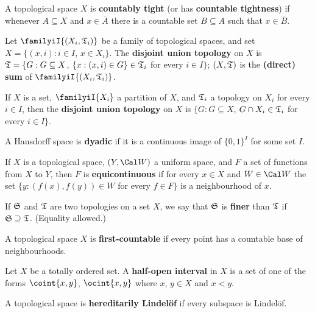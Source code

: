  A topological space $X$ is {\bf countably
tight}
(or has {\bf countable tightness}) if whenever $A\subseteq X$ and
$x\in\overline{A}$ there is a countable set $B\subseteq A$ such that
$x\in\overline{B}$.


 Let $\familyiI{(X_i,\frak T_i)}$ be
a family of topological spaces, and set
$X=\{(x,i):i\in I$, $x\in X_i\}$.
The {\bf disjoint union topology} on $X$ is $\frak T=\{G:G\subseteq X$,
$\{x:(x,i)\in G\}\in\frak T_i$ for every $i\in I\}$;  $(X,\frak T)$ is
the {\bf (direct) sum} of $\familyiI{(X_i,\frak T_i)}$.

If $X$ is a set, $\familyiI{X_i}$ a partition of $X$, and
$\frak T_i$ a topology on $X_i$ for every $i\in I$, then the {\bf
disjoint union topology} on $X$ is
$\{G:G\subseteq X$, $G\cap X_i\in\frak T_i$ for every $i\in I\}$.

 A Hausdorff space is {\bf dyadic} if it is a continuous
image of $\{0,1\}^I$ for some set $I$.

 If $X$ is a topological space, $(Y,\Cal W)$ a
uniform space, and $F$ a set of functions from $X$ to $Y$, then $F$ is {\bf
equicontinuous} if for every $x\in X$ and $W\in\Cal W$ the set
$\{y:(f(x),f(y))\in W$ for every $f\in F\}$ is a neighbourhood of $x$.

 If $\frak S$ and $\frak T$ are two topologies on
a set $X$, we say that $\frak S$ is {\bf finer} than $\frak T$ if
$\frak S\supseteq\frak T$.   (Equality allowed.)

 A topological space $X$ is
{\bf first-countable} if every point has a countable base of
neighbourhoods.

 Let $X$ be a totally ordered set.   A {\bf half-open
interval} in $X$ is a set of one of the forms $\coint{x,y}$,
$\ocint{x,y}$ where $x$, $y\in X$ and $x<y$.

 A topological space is {\bf
hereditarily Lindel\"of} if every subspace is Lindel\"of.

